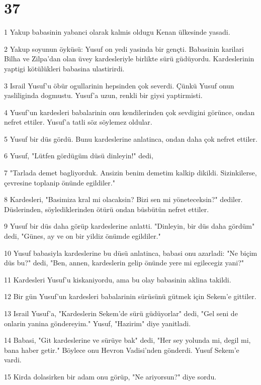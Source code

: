 \chapter{37}

\par 1 Yakup babasinin yabanci olarak kalmis oldugu Kenan ülkesinde yasadi.
\par 2 Yakup soyunun öyküsü: Yusuf on yedi yasinda bir gençti. Babasinin karilari Bilha ve Zilpa'dan olan üvey kardesleriyle birlikte sürü güdüyordu. Kardeslerinin yaptigi kötülükleri babasina ulastirirdi.
\par 3 Israil Yusuf'u öbür ogullarinin hepsinden çok severdi. Çünkü Yusuf onun yasliliginda dogmustu. Yusuf'a uzun, renkli bir giysi yaptirmisti.
\par 4 Yusuf'un kardesleri babalarinin onu kendilerinden çok sevdigini görünce, ondan nefret ettiler. Yusuf'a tatli söz söylemez oldular.
\par 5 Yusuf bir düs gördü. Bunu kardeslerine anlatinca, ondan daha çok nefret ettiler.
\par 6 Yusuf, "Lütfen gördügüm düsü dinleyin!" dedi,
\par 7 "Tarlada demet bagliyorduk. Ansizin benim demetim kalkip dikildi. Sizinkilerse, çevresine toplanip önünde egildiler."
\par 8 Kardesleri, "Basimiza kral mi olacaksin? Bizi sen mi yöneteceksin?" dediler. Düslerinden, söylediklerinden ötürü ondan büsbütün nefret ettiler.
\par 9 Yusuf bir düs daha görüp kardeslerine anlatti. "Dinleyin, bir düs daha gördüm" dedi, "Günes, ay ve on bir yildiz önümde egildiler."
\par 10 Yusuf babasiyla kardeslerine bu düsü anlatinca, babasi onu azarladi: "Ne biçim düs bu?" dedi, "Ben, annen, kardeslerin gelip önünde yere mi egilecegiz yani?"
\par 11 Kardesleri Yusuf'u kiskaniyordu, ama bu olay babasinin aklina takildi.
\par 12 Bir gün Yusuf'un kardesleri babalarinin sürüsünü gütmek için Sekem'e gittiler.
\par 13 Israil Yusuf'a, "Kardeslerin Sekem'de sürü güdüyorlar" dedi, "Gel seni de onlarin yanina göndereyim." Yusuf, "Hazirim" diye yanitladi.
\par 14 Babasi, "Git kardeslerine ve sürüye bak" dedi, "Her sey yolunda mi, degil mi, bana haber getir." Böylece onu Hevron Vadisi'nden gönderdi. Yusuf Sekem'e vardi.
\par 15 Kirda dolasirken bir adam onu görüp, "Ne ariyorsun?" diye sordu.
